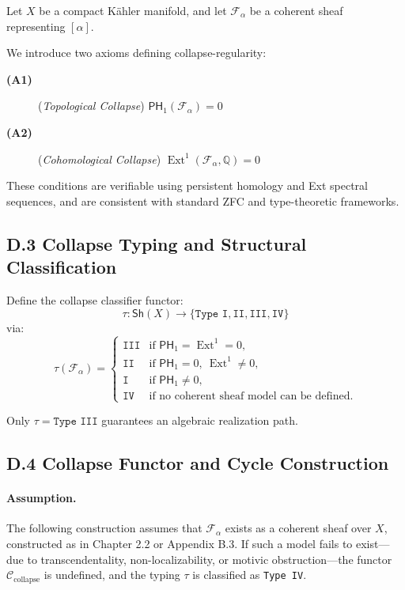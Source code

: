 \documentclass[11pt]{article}
\DeclareMathOperator{\Ext}{Ext}
\begin{document}
Let $X$ be a compact Kähler manifold, and let $\mathcal{F}_\alpha$ be a coherent sheaf representing $[\alpha]$.

We introduce two axioms defining collapse-regularity:

\begin{description}
  \item[\textbf{(A1)}] (\emph{Topological Collapse})  
    $\mathsf{PH}_1(\mathcal{F}_\alpha) = 0$
  \item[\textbf{(A2)}] (\emph{Cohomological Collapse})  
    $\Ext^1(\mathcal{F}_\alpha, \mathbb{Q}) = 0$
\end{description}

These conditions are verifiable using persistent homology and Ext spectral sequences, and are consistent with standard ZFC and type-theoretic frameworks.

\subsection*{D.3 Collapse Typing and Structural Classification}

Define the collapse classifier functor:
\[
\tau : \mathsf{Sh}(X) \longrightarrow \{ \texttt{Type I}, \texttt{II}, \texttt{III}, \texttt{IV} \}
\]
via:
\[
\tau(\mathcal{F}_\alpha) =
\begin{cases}
\texttt{III} & \text{if } \mathsf{PH}_1 = \Ext^1 = 0, \\
\texttt{II} & \text{if } \mathsf{PH}_1 = 0,\ \Ext^1 \ne 0, \\
\texttt{I} & \text{if } \mathsf{PH}_1 \ne 0, \\
\texttt{IV} & \text{if no coherent sheaf model can be defined}.
\end{cases}
\]

Only $\tau = \texttt{Type III}$ guarantees an algebraic realization path.

\subsection*{D.4 Collapse Functor and Cycle Construction}

\paragraph{Assumption.}
The following construction assumes that $\mathcal{F}_\alpha$ exists as a coherent sheaf over $X$, constructed as in Chapter 2.2 or Appendix B.3. If such a model fails to exist—due to transcendentality, non-localizability, or motivic obstruction—the functor $\mathcal{C}_{\text{collapse}}$ is undefined, and the typing $\tau$ is classified as \texttt{Type IV}.
\end{document}
